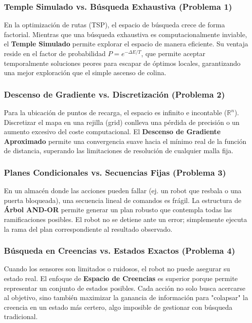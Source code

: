\subsubsection{Temple Simulado vs. Búsqueda Exhaustiva (Problema 1)}
En la optimización de rutas (TSP), el espacio de búsqueda crece de forma factorial. Mientras que una búsqueda exhaustiva es computacionalmente inviable, el \textbf{Temple Simulado} permite explorar el espacio de manera eficiente. Su ventaja reside en el factor de probabilidad $P = e^{-\Delta E / T}$, que permite aceptar temporalmente soluciones peores para escapar de óptimos locales, garantizando una mejor exploración que el simple ascenso de colina.

\subsubsection{Descenso de Gradiente vs. Discretización (Problema 2)}
Para la ubicación de puntos de recarga, el espacio es infinito e incontable ($\mathbb{R}^n$). Discretizar el mapa en una rejilla (grid) conlleva una pérdida de precisión o un aumento excesivo del coste computacional. El \textbf{Descenso de Gradiente Aproximado} permite una convergencia suave hacia el mínimo real de la función de distancia, superando las limitaciones de resolución de cualquier malla fija.

\subsubsection{Planes Condicionales vs. Secuencias Fijas (Problema 3)}
En un almacén donde las acciones pueden fallar (ej. un robot que resbala o una puerta bloqueada), una secuencia lineal de comandos es frágil. La estructura de \textbf{Árbol AND-OR} permite generar un plan robusto que contempla todas las ramificaciones posibles. El robot no se detiene ante un error; simplemente ejecuta la rama del plan correspondiente al resultado observado.

\subsubsection{Búsqueda en Creencias vs. Estados Exactos (Problema 4)}
Cuando los sensores son limitados o ruidosos, el robot no puede asegurar su estado real. El enfoque de \textbf{Espacio de Creencias} es superior porque permite representar un conjunto de estados posibles. Cada acción no solo busca acercarse al objetivo, sino también maximizar la ganancia de información para "colapsar" la creencia en un estado más certero, algo imposible de gestionar con búsqueda tradicional.

